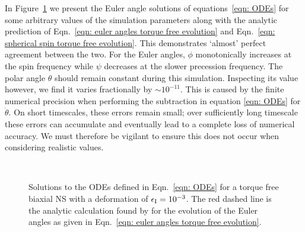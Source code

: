 \documentclass[../full_thesis/full_thesis.tex]{subfiles}
\begin{document}
In Figure~\ref{fig: biaxial body no torque} we present the Euler angle solutions
of equations~\eqref{eqn: ODEs} for some arbitrary values of the simulation
parameters along with the analytic prediction of Eqn.~\eqref{eqn: euler angles
torque free evolution} and Eqn.~\eqref{eqn: spherical spin torque free
evolution}. This demonstrates `almost' perfect agreement between the two. For
the Euler angles, $\phi$ monotonically
increases at the spin frequency while $\psi$ decreases at the slower precession
frequency. The polar angle $\theta$ should remain constant during this
simulation. Inspecting its value however, we find it varies fractionally by
$\sim 10^{-11}$.  This is caused by the finite numerical precision when
performing the subtraction in equation \eqref{eqn: ODEs} for $\dot{\theta}$. On
short timescales, these errors remain small; over sufficiently long timescale
these errors can accumulate and eventually lead to a complete loss of numerical
accuracy. We must therefore be vigilant to ensure this does not occur when
considering realistic values.
\afterpage{\clearpage}
\begin{figure}[p]
    \centering
{} \\
\caption{Solutions to the ODEs defined in Eqn.~\eqref{eqn: ODEs} for a
torque free biaxial NS with a deformation of $\epsilon_{\mathrm{I}} = 10^{-3}$. The red
dashed line is the analytic calculation found by \citet{Jones2001} for the
evolution of the Euler angles as given in Eqn.~\eqref{eqn: euler angles torque free evolution}.}
\label{fig: biaxial body no torque}
\end{figure}
\end{document}
